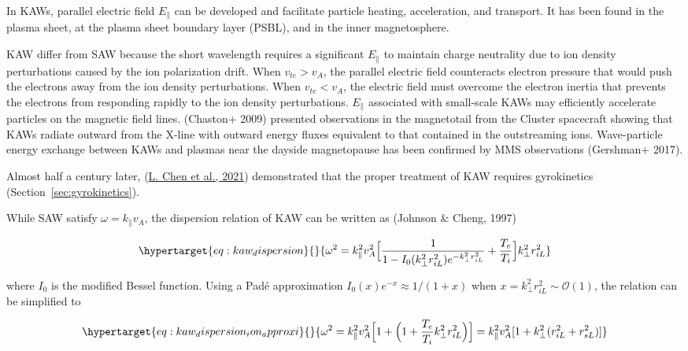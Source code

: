 \documentclass[
  notoc %
]{tufte-book}
\begin{document}
In KAWs, parallel electric field \(E_\parallel\) can be developed and
facilitate particle heating, acceleration, and transport. It has been
found in the plasma sheet, at the plasma sheet boundary layer (PSBL),
and in the inner magnetosphere.

KAW differ from SAW because the short wavelength requires a significant
\(E_\parallel\) to maintain charge neutrality due to ion density
perturbations caused by the ion polarization drift. When \(v_{te}>v_A\),
the parallel electric field counteracts electron pressure that would
push the electrons away from the ion density perturbations. When
\(v_{te}<v_A\), the electric field must overcome the electron inertia
that prevents the electrons from responding rapidly to the ion density
perturbations. \(E_\parallel\) associated with small-scale KAWs may
efficiently accelerate particles on the magnetic field lines. (Chaston+
2009) presented observations in the magnetotail from the Cluster
spacecraft showing that KAWs radiate outward from the X-line with
outward energy fluxes equivalent to that contained in the outstreaming
ions. Wave-particle energy exchange between KAWs and plasmas near the
dayside magnetopause has been confirmed by MMS observations (Gershman+
2017).

Almost half a century later, (\protect\hyperlink{ref-chen2021physics}{L.
Chen et al., 2021}) demonstrated that the proper treatment of KAW
requires gyrokinetics (Section~\ref{sec:gyrokinetics}).

While SAW satisfy \(\omega=k_\parallel v_A\), the dispersion relation of
KAW can be written as (Johnson \& Cheng, 1997)

\begin{equation}\protect\hypertarget{eq:kaw_dispersion}{}{
\omega^2 = k_\parallel^2 v_A^2 \Big[ \frac{1}{1-I_0(k_\perp^2 r_{iL}^2)e^{-k_\perp^2 r_{iL}^2}} + \frac{T_e}{T_i} \Big]k_\perp^2 r_{iL}^2
}\label{eq:kaw_dispersion}\end{equation}

where \(I_0\) is the modified Bessel function. Using a Padé
approximation \(I_0(x)e^{-x}\approx 1/(1+x)\) when
\(x=k_\perp^2r_{iL}^2\sim\mathcal{O}(1)\), the relation can be
simplified to

\begin{equation}\protect\hypertarget{eq:kaw_dispersion_ion_approxi}{}{
\omega^2 = k_\parallel^2 v_A^2\Big[1+\Big(1+\frac{T_e}{T_i}k_\perp^2r_{iL}^2\Big) \Big] =  k_\parallel^2 v_A^2 [1+k_\perp^2(r_{iL}^2+r_{sL}^2)]
}\label{eq:kaw_dispersion_ion_approxi}\end{equation}
\end{document}
